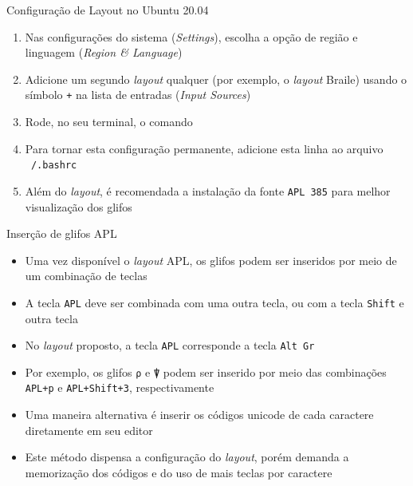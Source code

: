 \begin{frame}[fragile]{Configuração de Layout no Ubuntu 20.04}

    \begin{enumerate}
        \item Nas configurações do sistema (\textit{Settings}), escolha a opção de região e
            linguagem (\textit{Region \& Language})
        \pause

        \item Adicione um segundo \textit{layout} qualquer (por exemplo, o \textit{layout} Braile)
            usando o símbolo \texttt{+} na lista de entradas (\textit{Input Sources})
        \pause

        \item Rode, no seu terminal, o comando

        \pause

        \item Para tornar esta configuração permanente, adicione esta linha ao arquivo
            \texttt{~/.bashrc}
        \pause

        \item Além do \textit{layout}, é recomendada a instalação da fonte \texttt{APL 385} para
            melhor visualização dos glifos
    \end{enumerate}
\end{frame}

\begin{frame}[fragile]{Inserção de glifos APL}

    \begin{itemize}
        \item Uma vez disponível o \textit{layout} APL, os glifos podem ser inseridos por meio
            de um combinação de teclas
        \pause

        \item A tecla \texttt{APL} deve ser combinada com uma outra tecla, ou com a tecla
            \texttt{Shift} e outra tecla
        \pause

        \item No \textit{layout} proposto, a tecla \texttt{APL} corresponde a tecla
            \texttt{Alt Gr}
        \pause

        \item Por exemplo, os glifos \texttt{⍴} e \texttt{⍒} podem ser inserido por meio das combinações
            \texttt{APL+p} e \texttt{APL+Shift+3}, respectivamente

        \pause

        \item Uma maneira alternativa é inserir os códigos unicode de cada caractere diretamente
            em seu editor

        \pause

        \item Este método dispensa a configuração do \textit{layout}, porém demanda a memorização
            dos códigos e do uso de mais teclas por caractere
    \end{itemize}

\end{frame}

